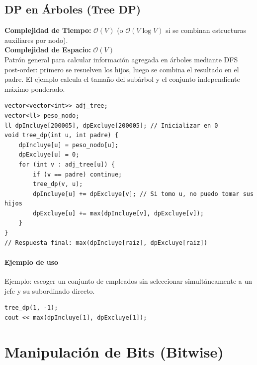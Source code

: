 \documentclass[10pt,twocolumn,letterpaper]{report}
\begin{document}
\section{DP en Árboles (Tree DP)}
\textbf{Complejidad de Tiempo:} $\mathcal{O}(V)$ (o $\mathcal{O}(V \log V)$ si se combinan estructuras auxiliares por nodo). \\
\textbf{Complejidad de Espacio:} $\mathcal{O}(V)$ \\
Patrón general para calcular información agregada en árboles mediante DFS post-order: primero se resuelven los hijos, luego se combina el resultado en el padre. El ejemplo calcula el tamaño del subárbol y el conjunto independiente máximo ponderado.
\begin{lstlisting}
vector<vector<int>> adj_tree;
vector<ll> peso_nodo;
ll dpIncluye[200005], dpExcluye[200005]; // Inicializar en 0
void tree_dp(int u, int padre) {
    dpIncluye[u] = peso_nodo[u];
    dpExcluye[u] = 0;
    for (int v : adj_tree[u]) {
        if (v == padre) continue;
        tree_dp(v, u);
        dpIncluye[u] += dpExcluye[v]; // Si tomo u, no puedo tomar sus hijos
        dpExcluye[u] += max(dpIncluye[v], dpExcluye[v]);
    }
}
// Respuesta final: max(dpIncluye[raiz], dpExcluye[raiz])
\end{lstlisting}
\subsubsection*{Ejemplo de uso}
Ejemplo: escoger un conjunto de empleados sin seleccionar simultáneamente a un jefe y su subordinado directo.
\begin{lstlisting}
tree_dp(1, -1);
cout << max(dpIncluye[1], dpExcluye[1]);
\end{lstlisting}

\chapter{Manipulación de Bits (Bitwise)}
\end{document}
